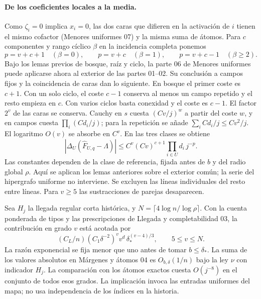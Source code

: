 \paragraph{De los coeficientes locales a la media.}
Como $\zeta_i=0$ implica $x_i=0$, las dos caras que difieren en la activación de $i$
tienen el mismo cofactor (Menores uniformes 07) y la misma suma de átomos.
Para $c$ componentes y rango cíclico $\beta$ en la incidencia completa ponemos
\[
 p=v+c+1\quad(\beta=0),\qquad p=v+c\quad(\beta=1),\qquad
 p=v+c-1\quad(\beta\ge2).
\]
Bajo los lemas previos de bosque, raíz y ciclo, la parte 06 de Menores uniformes puede
aplicarse ahora al exterior de las partes 01--02. Su conclusión a campos fijos y la
coincidencia de caras dan lo siguiente. En bosque el primer coste es $c+1$. Con un solo
ciclo, el coste $c-1$ conserva al menos un campo repetido y el resto empieza en $c$.
Con varios ciclos basta conexidad y el coste es $c-1$. El factor $2^v$ de las caras se
conserva. Cauchy en $s$ cuesta $(Cv/j)^w$ a partir del coste $w$, y en campos cuesta
$\prod_i(Cd_i/j)$; para la repetición se añade $\sum_i Cd_i/j\le Cv^2/j$.
El logaritmo $O(v)$ se absorbe en $C^v$. En las tres clases se obtiene
\[
 |\Delta_U(\widehat F_{U,q}-\Lambda)|
 \le C^v(Cv)^{c+1}\prod_{i\in U}d_i\, j^{-p}.
\]
Las constantes dependen de la clase de referencia, fijada antes de $b$ y del radio
global $\rho$. Aquí se aplican los lemas anteriores sobre el exterior común; la serie del
hipergrafo uniforme no interviene. Se excluyen las líneas individuales del resto entre
líneas. Para $v\ge5$ las sustracciones de parejas desaparecen.

Sea $H_j$ la llegada regular corta histórica, y $N=\lceil4\log n/\log\rho\rceil$.
Con la cuenta ponderada de tipos y las prescripciones de Llegada y completabilidad 03,
la contribución en grado $v$ está acotada por
\[
 (C_L/n)(C_1\delta^{-2})^v v^d\,\delta_*^{(v-4)/3},\qquad 5\le v\le N .
\]
La razón exponencial se fija menor que uno antes de tomar $b\le\delta_*$.
La suma de los valores absolutos en Márgenes y átomos 04 es $O_{b,\delta}(1/n)$
bajo la ley $\nu$ con indicador $H_j$. La comparación con los átomos exactos cuesta
$O(j^{-8})$ en el conjunto de todos esos grados. La implicación invoca las entradas
uniformes del mapa; no usa independencia de los índices en la historia.
